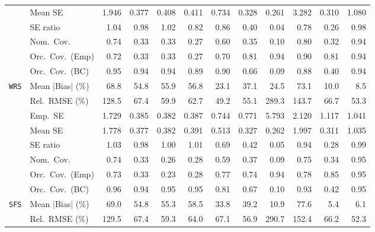 \begin{landscape}
\begin{longtable}{llrrrrrrrrrr}
 & Mean SE & 1.946 & 0.377 & 0.408 & 0.411 & 0.734 & 0.328 & 0.261 & 3.282 & 0.310 & 1.080 \\
 & SE ratio & 1.04 & \cellcolor{rankthree}0.98 & \cellcolor{rankone}1.02 & 0.82 & 0.86 & 0.40 & 0.04 & 0.78 & 0.26 & \cellcolor{ranktwo}0.98 \\
 & Nom.\ Cov. & \cellcolor{rankthree}0.74 & 0.33 & 0.33 & 0.27 & 0.60 & 0.35 & 0.10 & \cellcolor{ranktwo}0.80 & 0.32 & \cellcolor{rankone}0.94 \\
 & Orc.\ Cov.\ (Emp) & 0.72 & 0.33 & 0.33 & 0.27 & 0.70 & 0.81 & \cellcolor{rankone}0.94 & \cellcolor{rankthree}0.90 & 0.81 & \cellcolor{ranktwo}0.94 \\
 & Orc.\ Cov.\ (BC) & \cellcolor{rankone}0.95 & \cellcolor{ranktwo}0.94 & \cellcolor{rankthree}0.94 & 0.89 & 0.90 & 0.66 & 0.09 & 0.88 & 0.40 & 0.94 \\
\addlinespace[2pt]
\quad \texttt{WRS} & Mean $|$Bias$|$ (\%) & 68.8 & 54.8 & 55.9 & 56.8 & \cellcolor{rankthree}23.1 & 37.1 & 24.5 & 73.1 & \cellcolor{ranktwo}10.0 & \cellcolor{rankone}8.5 \\
 & Rel.\ RMSE (\%) & 128.5 & 67.4 & 59.9 & 62.7 & \cellcolor{rankone}49.2 & \cellcolor{rankthree}55.1 & 289.3 & 143.7 & 66.7 & \cellcolor{ranktwo}53.3 \\
 & Emp.\ SE & 1.729 & 0.385 & 0.382 & 0.387 & 0.744 & 0.771 & 5.793 & 2.120 & 1.117 & 1.041 \\
 & Mean SE & 1.778 & 0.377 & 0.382 & 0.391 & 0.513 & 0.327 & 0.262 & 1.997 & 0.311 & 1.035 \\
 & SE ratio & 1.03 & 0.98 & \cellcolor{rankone}1.00 & \cellcolor{rankthree}1.01 & 0.69 & 0.42 & 0.05 & 0.94 & 0.28 & \cellcolor{ranktwo}0.99 \\
 & Nom.\ Cov. & \cellcolor{rankthree}0.74 & 0.33 & 0.26 & 0.28 & 0.59 & 0.37 & 0.09 & \cellcolor{ranktwo}0.75 & 0.34 & \cellcolor{rankone}0.95 \\
 & Orc.\ Cov.\ (Emp) & 0.73 & 0.33 & 0.23 & 0.28 & 0.77 & 0.74 & \cellcolor{ranktwo}0.94 & 0.78 & \cellcolor{rankthree}0.85 & \cellcolor{rankone}0.95 \\
 & Orc.\ Cov.\ (BC) & 0.96 & 0.94 & \cellcolor{ranktwo}0.95 & \cellcolor{rankone}0.95 & 0.81 & 0.67 & 0.10 & 0.93 & 0.42 & \cellcolor{rankthree}0.95 \\
\addlinespace[2pt]
\quad \texttt{SFS} & Mean $|$Bias$|$ (\%) & 69.0 & 54.8 & 55.3 & 58.5 & 33.8 & 39.2 & \cellcolor{rankthree}10.9 & 77.6 & \cellcolor{rankone}5.4 & \cellcolor{ranktwo}6.1 \\
 & Rel.\ RMSE (\%) & 129.5 & 67.4 & \cellcolor{rankthree}59.3 & 64.0 & 67.1 & \cellcolor{ranktwo}56.9 & 290.7 & 152.4 & 66.2 & \cellcolor{rankone}52.3 \\

\end{longtable}
\end{landscape}
